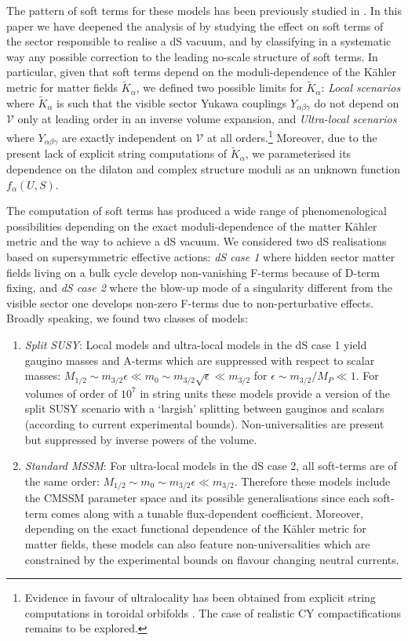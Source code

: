 \documentclass[11pt,a4paper]{article}
\newcommand\vo{{\mathcal{V}}}
\begin{document}
The pattern of soft terms for these models has been previously studied in \cite{Blumenhagen:2009gk}. In this paper we have deepened the analysis of \cite{Blumenhagen:2009gk} by studying the effect on soft terms of the sector responsible to realise a dS vacuum, and by classifying in a systematic way any possible correction to the leading no-scale structure of soft terms. In particular, given that soft terms depend on the moduli-dependence of the K\"ahler metric for matter fields $\tilde{K}_\alpha$, we defined two possible limits for $\tilde{K}_\alpha$: \emph{Local scenarios} where $\tilde{K}_\alpha$ is such that the visible sector Yukawa couplings $Y_{\alpha\beta\gamma}$ do not depend on $\vo$ only at leading order in an inverse volume expansion, and \emph{Ultra-local scenarios} where $Y_{\alpha\beta\gamma}$ are exactly independent on $\vo$ at all orders.\footnote{Evidence in favour of ultralocality has been obtained from explicit string computations in toroidal orbifolds \cite{Conlon:2011jq}.
The case of realistic CY compactifications remains to be explored.} Moreover, due to the present lack of explicit string computations of $\tilde{K}_\alpha$, we parameterised its dependence on the dilaton and complex structure moduli as an unknown function $f_\alpha(U,S)$.

The computation of soft terms has produced a wide range of phenomenological possibilities depending on the exact moduli-dependence of the matter K\"ahler metric and the way to achieve a dS vacuum. We considered two dS realisations based on supersymmetric effective actions: \emph{dS case 1} where hidden sector matter fields living on a bulk cycle develop non-vanishing F-terms because of D-term fixing, and \emph{dS case 2} where the blow-up mode of a singularity different from the visible sector one develops non-zero F-terms due to non-perturbative effects.
Broadly speaking, we found two classes of models:
\begin{enumerate}
\item \emph{Split SUSY}: Local models and ultra-local models in the dS case 1 yield gaugino masses and A-terms which are suppressed with respect to scalar masses: $M_{1/2} \sim m_{3/2}\epsilon\ll m_0 \sim m_{3/2} \sqrt{\epsilon}\ll m_{3/2}$
    for $\epsilon \sim m_{3/2}/M_P\ll 1$. For volumes of order of $10^7$ in string units these models provide a version of the split SUSY scenario with a `largish' splitting between gauginos and scalars (according to current experimental bounds). Non-universalities are present but suppressed by inverse powers of the volume.

\item \emph{Standard MSSM}: For ultra-local models in the dS case 2, all soft-terms are of the same order: $M_{1/2} \sim m_0 \sim m_{3/2}\epsilon\ll m_{3/2}$.
Therefore these models include the CMSSM parameter space and its possible generalisations since each soft-term comes along with a tunable flux-dependent coefficient. Moreover, depending on the exact functional dependence of the K\"ahler metric for matter fields, these models can also feature non-universalities which are constrained by the experimental bounds on flavour changing neutral currents.
\end{enumerate}
\end{document}
